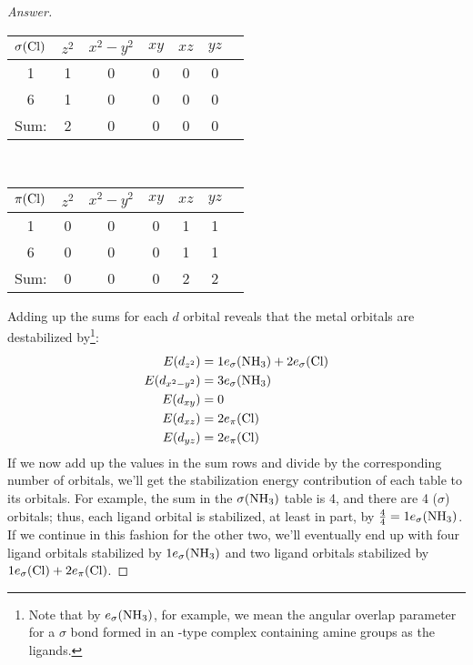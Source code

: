 \documentclass[../psets.tex]{subfiles}
\begin{document}
\begin{enumerate}[label={\Roman*)}]
\begin{enumerate}[label={\textbf{10.\arabic*}}]
\begin{proof}[Answer]
\begin{center}
                \hspace{2mm}
                \begin{tabular}{c|cccccc}
                    $\sigma(\ce{Cl})$ & $z^2$ & $x^2-y^2$ & $xy$ & $xz$ & $yz$\\
                    \hline
                    1 & 1 & 0 & 0 & 0 & 0\\
                    6 & 1 & 0 & 0 & 0 & 0\\
                    \hline
                    Sum: & 2 & 0 & 0 & 0 & 0\\
                \end{tabular}\\[1em]
                \hspace{2mm}
                \begin{tabular}{c|cccccc}
                    $\pi(\ce{Cl})$ & $z^2$ & $x^2-y^2$ & $xy$ & $xz$ & $yz$\\
                    \hline
                    1 & 0 & 0 & 0 & 1 & 1\\
                    6 & 0 & 0 & 0 & 1 & 1\\
                    \hline
                    Sum: & 0 & 0 & 0 & 2 & 2\\
                \end{tabular}
            \end{center}
            Adding up the sums for each $d$ orbital reveals that the metal orbitals are destabilized by\footnote{Note that by $e_\sigma(\ce{NH3})$, for example, we mean the angular overlap parameter for a $\sigma$ bond formed in an -type complex containing amine groups as the  ligands.}:
            \begin{align*}
                E(d_{z^2}) &= 1e_\sigma(\ce{NH3})+2e_\sigma(\ce{Cl})\\
                E(d_{x^2-y^2}) &= 3e_\sigma(\ce{NH3})\\
                E(d_{xy}) &= 0\\
                E(d_{xz}) &= 2e_\pi(\ce{Cl})\\
                E(d_{yz}) &= 2e_\pi(\ce{Cl})
            \end{align*}
            If we now add up the values in the sum rows and divide by the corresponding number of orbitals, we'll get the stabilization energy contribution of each table to its orbitals. For example, the sum in the $\sigma(\ce{NH3})$ table is 4, and there are 4 ($\sigma$) orbitals; thus, each  ligand orbital is stabilized, at least in part, by $\frac{4}{4}=1e_\sigma(\ce{NH3})$. If we continue in this fashion for the other two, we'll eventually end up with four ligand orbitals stabilized by $1e_\sigma(\ce{NH3})$ and two ligand orbitals stabilized by $1e_\sigma(\ce{Cl})+2e_\pi(\ce{Cl})$.

\end{proof}
\end{enumerate}
\end{enumerate}
\end{document}
